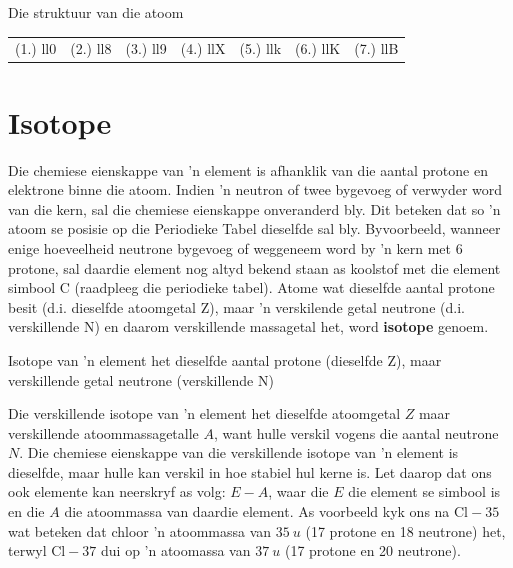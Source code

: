 \begin{exercises}{Die struktuur van die atoom}
\practiceinfo
\begin{tabular}[h]{cccccc}
 (1.) ll0  &  (2.) ll8  &  (3.) ll9  &  (4.) llX  &  (5.) llk  &  (6.) llK  &  (7.) llB  &
\end{tabular}
\end{exercises}


         \section{Isotope}
    \nopagebreak

Die chemiese eienskappe van  'n element is afhanklik van die aantal protone en elektrone binne die atoom. Indien  'n neutron of twee bygevoeg of verwyder word van die kern, sal die chemiese eienskappe onveranderd bly. Dit beteken dat so  'n atoom se posisie op die Periodieke Tabel dieselfde sal bly. Byvoorbeeld, wanneer enige hoeveelheid neutrone bygevoeg of weggeneem word by   'n kern met 6 protone, sal daardie element nog altyd bekend staan as koolstof met die element simbool $\text{C}$ (raadpleeg die periodieke tabel). Atome wat dieselfde aantal protone besit (d.i. dieselfde atoomgetal Z), maar 'n verskilende getal neutrone (d.i. verskillende N) en daarom verskillende massagetal het, word \textbf{isotope} genoem.\par 

 {Isotope van  'n element het dieselfde aantal protone (dieselfde Z), maar verskillende getal neutrone (verskillende N)} 
        

Die verskillende isotope van  'n element het dieselfde atoomgetal $Z$ maar verskillende atoommassagetalle $A$, want hulle verskil vogens die aantal neutrone $N$. Die chemiese eienskappe van die verskillende isotope van  'n element is dieselfde, maar hulle kan verskil in hoe stabiel hul kerne is. Let daarop dat ons ook elemente kan neerskryf as volg: $E - A$, waar die $E$ die element se simbool is en die $A$ die atoommassa van daardie element. As voorbeeld kyk ons na $\text{Cl}-35$ wat beteken dat chloor  'n atoommassa van $35 ~u$ (17 protone en 18 neutrone) het, terwyl $\text{Cl}-37$ dui op   'n atoomassa van $37 ~u$ (17 protone en 20 neutrone).  \par 


